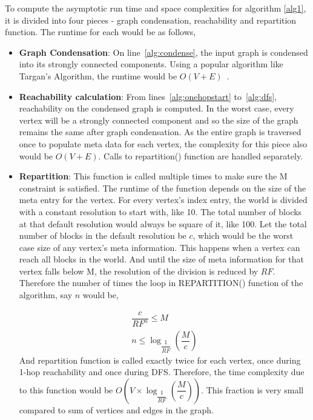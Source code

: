 To compute the asymptotic run time and space complexities for algorithm \ref{alg1}, it is divided into four pieces - graph condensation, reachability and repartition function. The runtime for each would be as follows,
\begin{itemize}

  \item \textbf{Graph Condensation}: On line~\ref{alg:condense}, the input graph is condensed into its strongly connected components. Using a popular algorithm like Targan's Algorithm, the runtime would be $O(V + E)$~\cite{R1972}.

  \item \textbf{Reachability calculation}: From lines~\ref{alg:onehopstart} to~\ref{alg:dfs}, reachability on the condensed graph is computed. In the worst case, every vertex will be a strongly connected component and so the size of the graph remains the same after graph condensation. As the entire graph is traversed once to populate meta data for each vertex, the complexity for this piece also would be $O(V + E)$. Calls to repartition() function are handled separately.


  \item \textbf{Repartition}: This function is called multiple times to make sure the M constraint is satisfied. The runtime of the function depends on the size of the meta entry for the vertex. For every vertex's index entry, the world is divided with a constant resolution to start with, like 10. The total number of blocks at that default resolution would always be square of it, like 100. Let the total number of blocks in the default resolution be $c$, which would be the worst case size of any vertex's meta information. This happens when a vertex can reach all blocks in the world. And until the size of meta information for that vertex falls below M, the resolution of the division is reduced by $RF$. Therefore the number of times the loop in REPARTITION() function of the algorithm, say $n$ would be,

  \begin{eqnarray*}
  	\dfrac{c}{RF^n} \leq M\\
  	n \leq {\log_{\dfrac{1}{RF}} (\dfrac{M}{c})}
  \end{eqnarray*}
  And repartition function is called exactly twice for each vertex, once during 1-hop reachability and once during DFS. Therefore, the time complexity due to this function would be $O(V \times {\log_{\dfrac{1}{RF}} (\dfrac{M}{c})})$. This fraction is very small compared to sum of vertices and edges in the graph.
\end{itemize}

